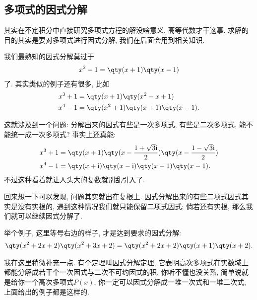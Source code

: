 \documentclass{ctexbook}
\newcommand{\im}{\mathrm{i}}
\begin{document}
{\subsection{多项式的因式分解}
其实在不定积分中直接研究多项式方程的解没啥意义, 高等代数才干这事. 求解的目的其实是要对多项式进行因式分解, 我们在后面会用到相关知识. \par
我们最熟知的因式分解莫过于
\begin{align*}
x^{2}-1=\qty(x+1)\qty(x-1)
\end{align*}
了. 其实类似的例子还有很多, 比如
\begin{align*}
x^{3}+1={}&\qty(x+1)\qty(x^{2}-x+1)\\
x^{4}-1={}&\qty(x^{2}+1)\qty(x+1)\qty(x-1)
.\end{align*}\par
这就涉及到一个问题: 分解出来的因式有些是一次多项式, 有些是二次多项式, 能不能统一成一次多项式? 事实上还真能: 
\begin{align*}
x^{3}+1={}&\qty(x+1)\qty(x-\frac{1+\sqrt{3}\im}{2})\qty(x-\frac{1-\sqrt{3}\im}{2})\\
x^{4}-1={}&\qty(x+\im)\qty(x-\im)\qty(x+1)\qty(x-1)
.\end{align*}
不过这种看着就让人头大的复数就别乱引入了. \par
回来想一下可以发现, 问题其实就出在复根上. 因式分解出来的有些二项式因式其实是没有实根的, 遇到这种情况我们就只能保留二项式因式; 倘若还有实根, 那么我们就可以继续因式分解了. \par
举个例子, 这里等号右边的样子, 才是达到要求的因式分解: 
\begin{align*}
\qty(x^{2}+2x+2)\qty(x^{2}+3x+2)=\qty(x^{2}+2x+2)\qty(x+1)\qty(x+2)
.\end{align*}\par
我在这里稍微补充一点. 有个定理叫因式分解定理, 它表明高次多项式在实数域上都能分解成若干个一次因式与二次不可约因式的积. 你听不懂也没关系, 简单说就是给你一个高次多项式$P(x)$, 你一定可以因式分解成一堆一次式和一堆二次式, 上面给出的例子都是这样的. \par
}
\end{document}
